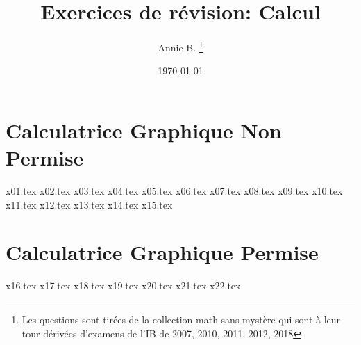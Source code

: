\documentclass[10pt]{article}
\newcounter{question}
\begin{document}
 

\title{Exercices de révision: Calcul}
\author{Annie B. \thanks{Les questions sont tirées de la collection math sans mystère qui sont à leur tour dérivées d'examens de l'IB de 2007, 2010, 2011, 2012, 2018}}
\date{\today}
\maketitle

\newpage
\section*{\textbf{Calculatrice Graphique Non Permise}}
{x01.tex}
{x02.tex}
{x03.tex}
{x04.tex}
{x05.tex}
{x06.tex}
{x07.tex}
{x08.tex}
{x09.tex}
{x10.tex}
{x11.tex}
{x12.tex}
{x13.tex}
{x14.tex}
{x15.tex}
\section*{\textbf{Calculatrice Graphique Permise}}
{x16.tex}
{x17.tex}
{x18.tex}
{x19.tex}
{x20.tex}
{x21.tex}
{x22.tex}
\end{document}
